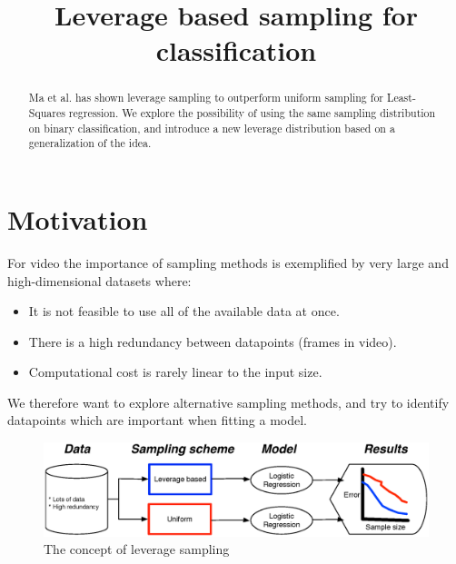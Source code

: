 \documentclass{article}
\title{Leverage based sampling for classification }
\begin{document}
%

\maketitle
%
\begin{abstract}
%
Ma et al. \cite{Ma} has shown leverage sampling to outperform uniform sampling for Least-Squares regression. We explore the possibility of using the same sampling distribution on binary classification, and introduce a new leverage distribution based on a generalization of the idea.
%
\end{abstract}

\section{Motivation}
For video the importance of sampling methods is exemplified by very large and high-dimensional datasets where:

\begin{itemize}
\item It is not feasible to use all of the available data at once.
\item There is a high redundancy between datapoints (frames in video).
\item Computational cost is rarely linear to the input size.
\end{itemize}

We therefore want to explore alternative sampling methods, and try to identify datapoints which are important when fitting a model.
%

\begin{figure}[b]
\centering
\includegraphics[width=\linewidth]{images/ThoughtModel}
\caption{The concept of leverage sampling}
\label{fig:concept}
\end{figure}
\end{document}
